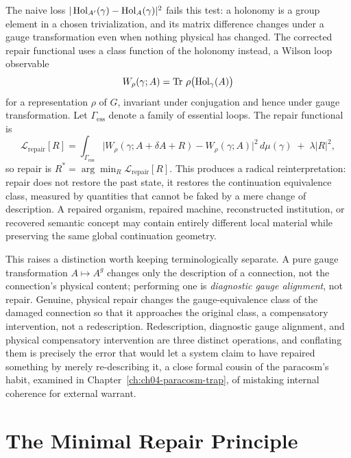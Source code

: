 The naive loss $|\operatorname{Hol}_{A'}(\gamma) - \operatorname{Hol}_A(\gamma)|^2$ fails this test: a holonomy is a group element in a chosen trivialization, and its matrix difference changes under a gauge transformation even when nothing physical has changed. The corrected repair functional uses a class function of the holonomy instead, a Wilson loop observable
\[
W_\rho(\gamma; A) = \operatorname{Tr}\, \rho\bigl(\operatorname{Hol}_\gamma(A)\bigr)
\]
for a representation $\rho$ of $G$, invariant under conjugation and hence under gauge transformation. Let $\Gamma_{\mathrm{ess}}$ denote a family of essential loops. The repair functional is
\[
\mathcal{L}_{\mathrm{repair}}[R] = \int_{\Gamma_{\mathrm{ess}}} \bigl| W_\rho(\gamma; A+\delta A+R) - W_\rho(\gamma; A) \bigr|^2\, d\mu(\gamma) \;+\; \lambda |R|^2,
\]
so repair is $R^\ast = \arg\min_R \mathcal{L}_{\mathrm{repair}}[R]$. This produces a radical reinterpretation: repair does not restore the past state, it restores the continuation equivalence class, measured by quantities that cannot be faked by a mere change of description. A repaired organism, repaired machine, reconstructed institution, or recovered semantic concept may contain entirely different local material while preserving the same global continuation geometry.

This raises a distinction worth keeping terminologically separate. A pure gauge transformation $A \mapsto A^g$ changes only the description of a connection, not the connection's physical content; performing one is \emph{diagnostic gauge alignment}, not repair. Genuine, physical repair changes the gauge-equivalence class of the damaged connection so that it approaches the original class, a compensatory intervention, not a redescription. Redescription, diagnostic gauge alignment, and physical compensatory intervention are three distinct operations, and conflating them is precisely the error that would let a system claim to have repaired something by merely re-describing it, a close formal cousin of the paracosm's habit, examined in Chapter~\ref{ch:ch04-paracosm-trap}, of mistaking internal coherence for external warrant.

\section{The Minimal Repair Principle}

